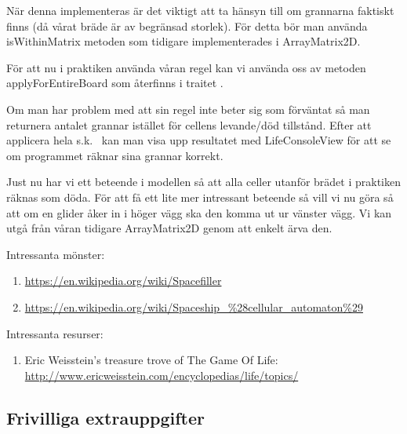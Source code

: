         När denna implementeras är det viktigt att ta hänsyn till om grannarna faktiskt finns (då vårat bräde är av begränsad storlek).
        För detta bör man använda isWithinMatrix metoden som tidigare implementerades i ArrayMatrix2D.

        För att nu i praktiken använda våran regel kan vi använda oss av metoden applyForEntireBoard som återfinns i traitet .

        Om man har problem med att sin regel inte beter sig som förväntat så man returnera antalet grannar istället
        för cellens levande/död tillstånd. Efter att applicera hela s.k.\  kan man visa upp resultatet med LifeConsoleView för att se om programmet räknar sina grannar korrekt.


    Just nu har vi ett beteende i modellen så att alla celler utanför brädet i praktiken räknas som döda.
    För att få ett lite mer intressant beteende så vill vi nu göra så att om en glider åker in i höger vägg
    ska den komma ut ur vänster vägg. Vi kan utgå från våran tidigare ArrayMatrix2D genom att enkelt ärva den.




Intressanta mönster:

\begin{enumerate}
    \item \url{https://en.wikipedia.org/wiki/Spacefiller}
    \item \url{https://en.wikipedia.org/wiki/Spaceship_\%28cellular_automaton\%29}
\end{enumerate}

Intressanta resurser:

\begin{enumerate}
    \item Eric Weisstein's treasure trove of The Game Of Life: \url{http://www.ericweisstein.com/encyclopedias/life/topics/}
\end{enumerate}


\subsection{Frivilliga extrauppgifter}

